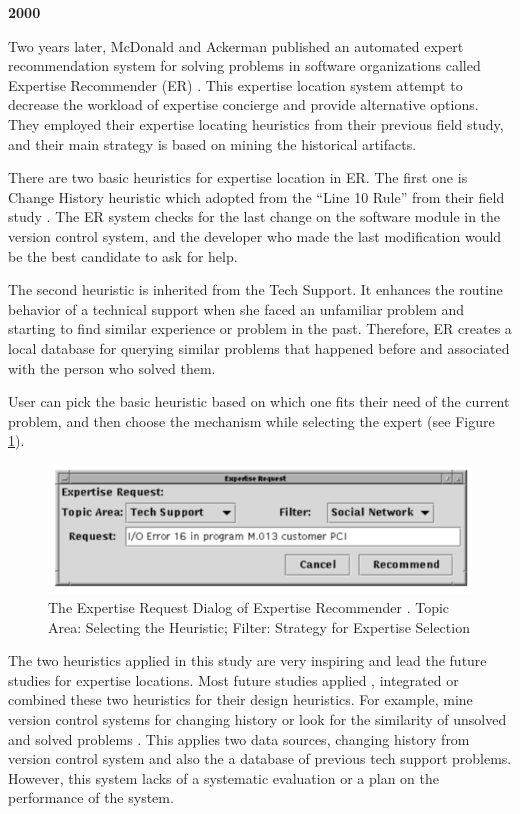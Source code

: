 \textbf{\citeauthor{mcdonald2000expertise} 2000}

Two years later, McDonald and Ackerman published an automated expert recommendation system for solving problems in software organizations called Expertise Recommender (ER) \cite{mcdonald2000expertise}. This expertise location system attempt to decrease the workload of expertise concierge and provide alternative options. They employed their expertise locating heuristics from their previous field study, and their main strategy is based on mining the historical artifacts.

There are two basic heuristics for expertise location in ER. The first one is Change History heuristic which adopted from the ``Line 10 Rule''
from their field study \cite{mcdonald1998just}. The ER system checks for the last change on the software module in the version control system, and the developer who made the last modification would be the best candidate to ask for help.

The second heuristic is inherited from the Tech Support. It enhances the routine behavior of a technical support when she faced an unfamiliar problem and starting to find similar experience or problem in the past. Therefore, ER creates a local database for querying similar problems that happened before and associated with the person who solved them.

User can pick the basic heuristic based on which one fits their need of the current problem, and then choose the mechanism while selecting the expert (see Figure \ref{ERUI}).

\begin{figure}
\includegraphics[width = 0.5\columnwidth]{ERUI.png}
\centering
\caption{The Expertise Request Dialog of Expertise Recommender \cite{mcdonald2000expertise}. Topic Area: Selecting the Heuristic; Filter: Strategy for Expertise Selection}
\label{ERUI}
\end{figure}

The two heuristics applied in this study are very inspiring and lead the future studies for expertise locations. Most future studies applied , integrated or combined these two heuristics for their design heuristics. For example, mine version control systems for changing history \cite{mockus2002expertise, schuler2008mining} or look for the similarity of unsolved and solved problems \cite{Anvik2006who, xu2016predicting}. This applies two data sources, changing history from version control system and also the a database of previous tech support problems. However, this system lacks of a systematic evaluation or a plan on the performance of the system.

